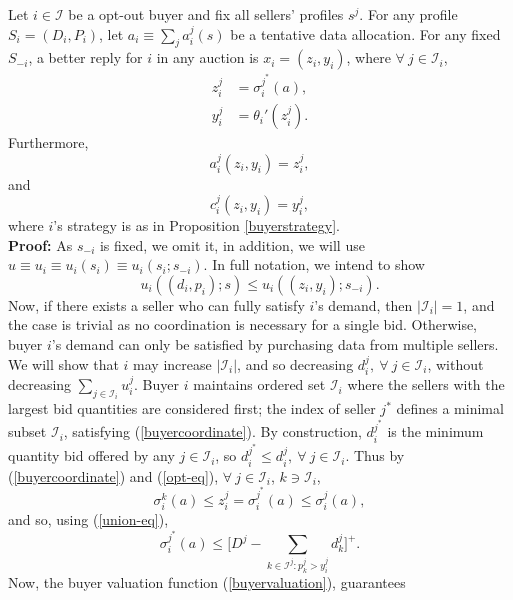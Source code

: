 \documentclass[sigconf, anonymous]{acmart}
\newcommand{\mcI}{\mathcal{I}}
\newcommand{\g}{\sigma}
\theoremstyle{definition}
\begin{document}
{
\label{coordinationlemma} 
Let $i\in\mcI$ be a opt-out buyer and fix all sellers' profiles $s^j$.
For any profile $S_i = (D_i, P_i)$, let $a_i \equiv \sum_j a_i^j(s)$ be a
tentative data
allocation. For any fixed $S_{-i}$, a better reply for $i$ in any auction is $x_i =
(z_i,y_i)$, where $\forall \ j \in \mcI_i$,
\begin{align*}
    z_i^j &= \g_i^{j^*}(a), \\
    y_i^j &= \theta_i'(z_i^j).
\end{align*}
Furthermore,
\begin{equation}\label{allocationcoordination}
    a_i^j(z_i,y_i) = z_i^{j},
\end{equation}
and
\begin{equation}\label{costcoordination}
    c_i^j(z_i,y_i) = y_i^{j},
\end{equation}
where $i$'s strategy is as in Proposition \ref{buyerstrategy}.
}\\
\textbf{Proof:}
As $s_{-i}$ is fixed, we omit it, in addition, we will use $u\equiv u_i \equiv u_i(s_i) \equiv
u_i(s_i;s_{-i})$. In full notation, we intend to show
$$
    u_i((d_i,p_i);s) \le u_i((z_i,y_i);s_{-i}).
$$
Now, if there exists a seller who can fully satisfy $i$'s demand,
then $\vert\mcI_i\vert = 1$, and the case is trivial as no
coordination is necessary for a single bid. %
Otherwise, buyer $i$'s demand can only be satisfied by purchasing data from
multiple sellers.
We will show that $i$ may increase $\vert\mcI_i\vert$, and so decreasing
$d_i^j, \ \forall \ j\in\mcI_i$, without decreasing $\sum_{j\in\mcI_i}u_i^j$.
Buyer $i$ maintains ordered set $\mcI_i$ where the sellers with the
largest bid quantities are considered first; the index of seller $j^*$ defines
a minimal subset $\mcI_i$, satisfying (\ref{buyercoordinate}). By construction, 
$d_i^{j^*}$ is the minimum quantity bid offered by any $j\in \mcI_i$,
so $d_i^{j^*} \le d_i^j, \ \forall \ j \in \mcI_i$. 
Thus by (\ref{buyercoordinate}) and (\ref{opt-eq}), $\forall \ j\in \mcI_i$,
$k\ni\mcI_i$,
$$
    \g_i^k(a) \le z_i^j = \g_i^{j^*}(a) \le \g_i^{j}(a),
$$
and so, using (\ref{union-eq}), 
\begin{equation}\label{minimaleq}
    \g_i^{j^*}(a)  \le \bigg\lbrack D^{j} - \sum_{k\in \mcI^j : p_k^{j}> y_{i}^{j}} d_k^{j}\bigg\rbrack^+.
\end{equation}
Now, the buyer valuation function (\ref{buyervaluation}), guarantees
\end{document}
